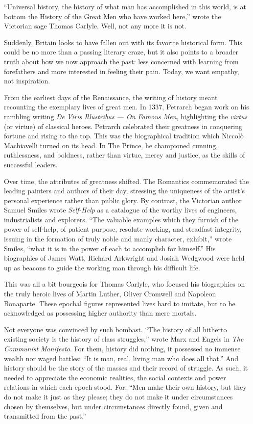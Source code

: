 \documentclass[UTF8,11pt]{ctexart}
\begin{document}
“Universal history, the history of what man has accomplished in this world, is at bottom the History of the Great Men who have worked here,” wrote the Victorian sage Thomas Carlyle. Well, not any more it is not.


Suddenly, Britain looks to have fallen out with its favorite historical form. This could be no more than a passing literary craze, but it also points to a broader truth about how we now approach the past: less concerned with learning from forefathers and more interested in feeling their pain. Today, we want empathy, not inspiration.


From the earliest days of the Renaissance, the writing of history meant recounting the exemplary lives of great men. In 1337, Petrarch began work on his rambling writing \textit{De Viris Illustribus — On Famous Men}, highlighting the \textit{virtus} (or virtue) of classical heroes. Petrarch celebrated their greatness in conquering fortune and rising to the top. This was the biographical tradition which Niccolò Machiavelli turned on its head. In The Prince, he championed cunning, ruthlessness, and boldness, rather than virtue, mercy and justice, as the skills of successful leaders.


Over time, the attributes of greatness shifted. The Romantics commemorated the leading painters and authors of their day, stressing the uniqueness of the artist’s personal experience rather than public glory. By contrast, the Victorian author Samuel Smiles wrote \textit{Self-Help} as a catalogue of the worthy lives of engineers, industrialists and explorers. “The valuable examples which they furnish of the power of self-help, of patient purpose, resolute working, and steadfast integrity, issuing in the formation of truly noble and manly character, exhibit,” wrote Smiles, “what it is in the power of each to accomplish for himself.” His biographies of James Watt, Richard Arkwright and Josiah Wedgwood were held up as beacons to guide the working man through his difficult life.


This was all a bit bourgeois for Thomas Carlyle, who focused his biographies on the truly heroic lives of Martin Luther, Oliver Cromwell and Napoleon Bonaparte. These epochal figures represented lives hard to imitate, but to be acknowledged as possessing higher authority than mere mortals.


Not everyone was convinced by such bombast. “The history of all hitherto existing society is the history of class struggles,” wrote Marx and Engels in \textit{The Communist} \textit{Manifesto}. For them, history did nothing, it possessed no immense wealth nor waged battles: “It is man, real, living man who does all that.” And history should be the story of the masses and their record of struggle. As such, it needed to appreciate the economic realities, the social contexts and power relations in which each epoch stood. For: “Men make their own history, but they do not make it just as they please; they do not make it under circumstances chosen by themselves, but under circumstances directly found, given and transmitted from the past.”
\end{document}
